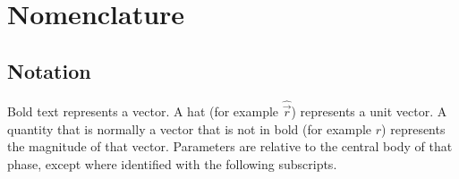 \chapter*{Nomenclature}

\section*{Notation}

Bold text represents a vector. A hat (for example $\hat{\vec{r}}$) represents a unit vector. A quantity that is normally a vector that is not in bold (for example $r$) represents the magnitude of that vector. Parameters are relative to the central body of that phase, except where identified with the following subscripts.

\begin{longtable}{l p{}}


\end{longtable}
